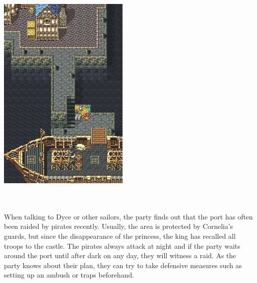\begin{center} \includegraphics[width=\columnwidth]{./art/chaosincornelia/port.jpg} \end{center}
%
\\\\
%
When talking to Dyce or other sailors, the party finds out that the port has often been raided by pirates recently.
Usually, the area is protected by Cornelia's guards, but since the disappearance of the princess, the king has recalled all troops to the castle.
The pirates always attack at night and if the party waits around the port until after dark on any day, they will witness a raid.
As the party knows about their plan, they can try to take defensive measures such as setting up an ambush or traps beforehand.
